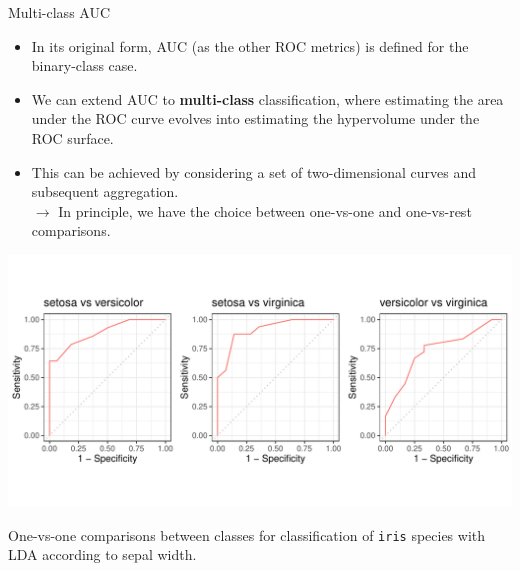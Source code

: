 \documentclass[11pt,compress,t,notes=noshow, xcolor=table]{beamer}
\begin{document}

\begin{vbframe}{Multi-class AUC}


\begin{itemize}
  \small
  \item In its original form, AUC (as the other ROC metrics) is defined for the 
  binary-class case.
  \item We can extend AUC to \textbf{multi-class} classification, where 
  estimating the area under the ROC curve evolves into estimating the 
  hypervolume under the ROC surface.
  \item This can be achieved by considering a set of two-dimensional curves and 
  subsequent aggregation. \\
  $\rightarrow$ In principle, we have the choice between one-vs-one and 
  one-vs-rest comparisons.
\end{itemize}  

\vfill
 
\begin{minipage}[c]{0.75\textwidth}
  \centering
  \includegraphics[trim = 0 40 -20 40, clip, width=\textwidth]
  {figure/eval_auc_extensions}
\end{minipage}%
\begin{minipage}[c]{0.25\textwidth}
  \scriptsize
  \raggedright
  One-vs-one comparisons between classes for classification of \texttt{iris} 
  species with LDA according to sepal width.
\end{minipage}
 
 

\end{vbframe}
\end{document}
